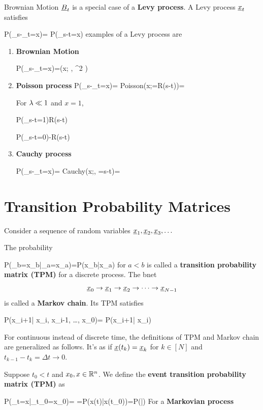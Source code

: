 Brownian Motion $\rvB_t$
is a special case of a {\bf Levy process}. A Levy process
$\rvx_t$ satisfies

\beq
P(\rvx_s-\rvx_t=x)= P(\rvx_{s-t}=x)
 examples of a Levy process are

\begin{enumerate}
\item {\bf Brownian Motion}

\beq
P(\rvx_s-\rvx_t=x)=\caln(x;
, \s^2 )
\eeq
\item {\bf Poisson process}
\beq
P(\rvx_s-\rvx_t=x)= {\rm Poisson}(x;\lam=R(s-t))=
\quad
{}
\eeq

For $\lambda\ll 1$ and $x=1$,

\beq
P(\rvx_{s-t}=1)\approx R(s-t)
\eeq

\beq
P(\rvx_{s-t}=0)-R(s-t)
\eeq

\item {\bf Cauchy process}

\beq
P(\rvx_s-\rvx_t=x)= 
{\rm Cauchy}(x;, \gamma=s-t)=
\quad
{}
\eeq

\end{enumerate}

\section{Transition Probability Matrices}

Consider a sequence of random variables $\rvx_1, \rvx_2, \rvx_3, \dots$

The probability 

\beq
P(\rvx_b=x_b|\rvx_a=x_a)=P(x_b|x_a)
\eeq
for $a<b$ is called a {\bf transition probability matrix (TPM)} for a discrete 
process.
 The bnet
$$
\rvx_0\rarrow\rvx_1\rarrow \rvx_2\rarrow\cdots\rarrow\rvx_{N-1}$$
is called a {\bf Markov chain}. Its TPM satisfies

\beq
P(x_{i+1}| x_i, x_{i-1}, \ldots, x_0)=
P(x_{i+1}| x_i)
\eeq

For continuous instead of discrete time,
the definitions of TPM and Markov chain are generalized
as follows.
It's as if $\rvx(t_k)=\rvx_k$ for $k\in[N]$ and $t_{k-1}-t_k=\Delta t\to 0$.

Suppose  $t_0<t$ and $x_0, x\in { \mathbb{R}}^n$.
We define
the {\bf event transition probability matrix (TPM)} as

\beq
P(\rvx_t=x|\rvx_{t_0}=x_0)=
=P(x(t)|x(t_0))=P(|)
\eeq
For a {\bf Markovian process}

